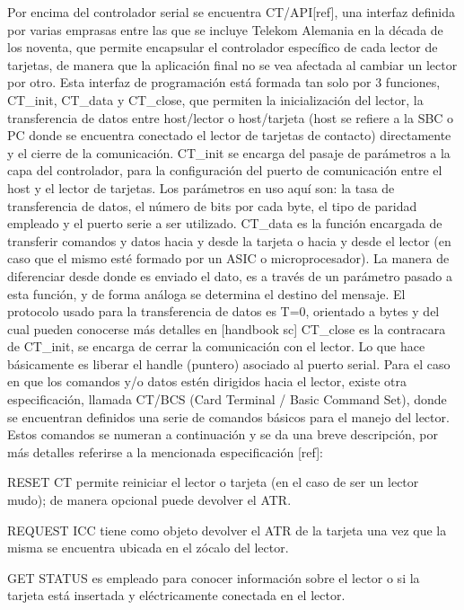 \bigskip
{}
Por encima del controlador serial se encuentra CT/API[ref], una interfaz definida por varias emprasas entre las que se incluye Telekom Alemania en la década de los noventa, que permite encapsular el controlador específico de cada lector de tarjetas, de manera que la aplicación final no se vea afectada al cambiar un lector por otro.
Esta interfaz de programación está formada tan solo por 3 funciones, CT\_init, CT\_data y CT\_close, que permiten la inicialización del lector, la transferencia de datos entre host/lector o host/tarjeta (host se refiere a la SBC o PC donde se encuentra conectado el lector de tarjetas de contacto) directamente y el cierre de la comunicación.
CT\_init se encarga del pasaje de parámetros a la capa del controlador, para la configuración del puerto de comunicación entre el host y el lector de tarjetas. Los parámetros en uso aquí son: la tasa de transferencia de datos, el número de bits por cada byte, el tipo de paridad empleado y el puerto serie a ser utilizado.
CT\_data es la función encargada de transferir comandos y datos hacia y desde la tarjeta o hacia y desde el lector (en caso que el mismo esté formado por un ASIC o microprocesador). La manera de diferenciar desde donde es enviado el dato, es a través de un parámetro pasado a esta función, y de forma análoga se determina el destino del mensaje. El protocolo usado para la transferencia de datos es T=0, orientado a bytes y del cual pueden conocerse más detalles en [handbook sc]
CT\_close es la contracara de  CT\_init, se encarga de cerrar la comunicación con el lector. Lo que hace básicamente es liberar el handle (puntero) asociado al puerto serial.
Para el caso en que los comandos y/o datos estén dirigidos hacia el lector, existe otra especificación, llamada CT/BCS (Card Terminal / Basic Command Set), donde se encuentran definidos una serie de comandos básicos para el manejo del lector. Estos comandos se numeran a continuación y se da una breve descripción, por más detalles referirse a la mencionada especificación [ref]:

RESET CT permite reiniciar el lector o tarjeta (en el caso de ser un lector mudo); de manera opcional puede devolver el ATR.

REQUEST ICC tiene como objeto devolver el ATR de la tarjeta una vez que la misma se encuentra ubicada en el zócalo del lector.

GET STATUS es empleado para conocer información sobre el lector o si la tarjeta está insertada y eléctricamente conectada en el lector. 

